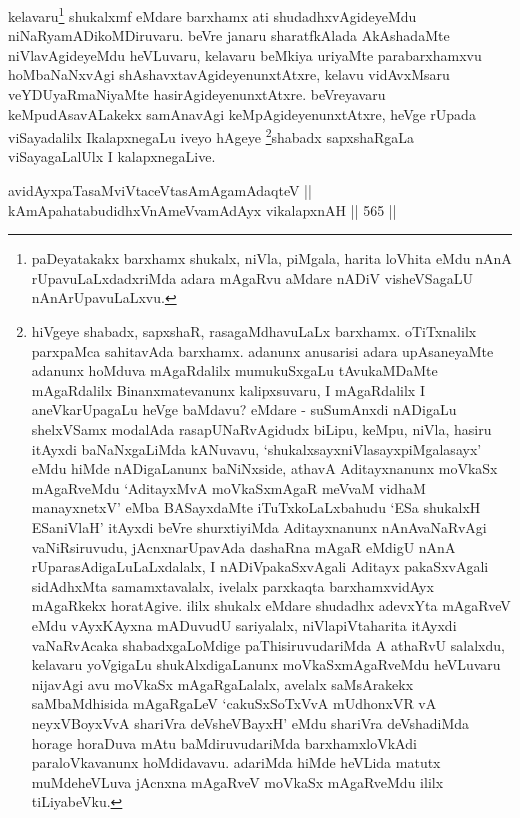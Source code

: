 \begin{artha}
kelavaru\footnote{paDeyatakakx barxhamx shukalx, niVla, piMgala,
harita loVhita eMdu nAnA rUpavuLaLxdadxriMda adara mAgaRvu aMdare
nADiV visheVSagaLU nAnArUpavuLaLxvu.} shukalxmf eMdare barxhamx ati shudadhxvAgideyeMdu niNaRyamADikoMDiruvaru. beVre janaru sharatfkAlada
AkAshadaMte niVlavAgideyeMdu heVLuvaru, kelavaru beMkiya uriyaMte
parabarxhamxvu hoMbaNaNxvAgi shAshavxtavAgideyenunxtAtxre, kelavu
vidAvxMsaru veYDUyaRmaNiyaMte hasirAgideyenunxtAtxre. beVreyavaru
keMpudAsavALakekx samAnavAgi keMpAgideyenunxtAtxre, heVge rUpada
viSayadalilx IkalapxnegaLu iveyo hAgeye \footnote{hiVgeye shabadx,
sapxshaR, rasagaMdhavuLaLx barxhamx. oTiTxnalilx parxpaMca sahitavAda
barxhamx. adanunx anusarisi adara upAsaneyaMte adanunx hoMduva
mAgaRdalilx mumukuSxgaLu tAvukaMDaMte mAgaRdalilx Binanxmatevanunx
kalipxsuvaru, I mAgaRdalilx I aneVkarUpagaLu heVge baMdavu?
eMdare - suSumAnxdi nADigaLu shelxVSamx modalAda rasapUNaRvAgidudx
biLipu, keMpu, niVla, hasiru itAyxdi baNaNxgaLiMda kANuvavu,
`shukalxsayxniVlasayxpiMgalasayx' eMdu hiMde nADigaLanunx
baNiNxside, athavA Aditayxnanunx moVkaSx mAgaRveMdu `AditayxMvA
moVkaSxmAgaR meVvaM vidhaM manayxnetxV' eMba BASayxdaMte
iTuTxkoLaLxbahudu `ESa shukalxH ESaniVlaH' itAyxdi beVre
shurxtiyiMda Aditayxnanunx nAnAvaNaRvAgi vaNiRsiruvudu,
jAcnxnarUpavAda dashaRna mAgaR eMdigU nAnA rUparasAdigaLuLaLxdalalx,
I nADiVpakaSxvAgali Aditayx pakaSxvAgali sidAdhxMta samamxtavalalx,
ivelalx parxkaqta barxhamxvidAyx mAgaRkekx horatAgive. ililx shukalx
eMdare shudadhx adevxYta mAgaRveV eMdu vAyxKAyxna mADuvudU
sariyalalx, niVlapiVtaharita itAyxdi vaNaRvAcaka shabadxgaLoMdige
paThisiruvudariMda A athaRvU salalxdu, kelavaru yoVgigaLu
shukAlxdigaLanunx moVkaSxmAgaRveMdu heVLuvaru nijavAgi avu moVkaSx
mAgaRgaLalalx, avelalx saMsArakekx saMbaMdhisida mAgaRgaLeV `cakuSxSoTxVvA mUdhonxVR vA \s neyxVBoyxVvA shariVra deVsheVBayxH' eMdu shariVra deVshadiMda horage horaDuva mAtu baMdiruvudariMda
barxhamxloVkAdi paraloVkavanunx hoMdidavavu. adariMda hiMde heVLida
matutx muMdeheVLuva jAcnxna mAgaRveV moVkaSx mAgaRveMdu ililx tiLiyabeVku.}shabadx
sapxshaRgaLa viSayagaLalUlx I kalapxnegaLive.
\end{artha}


\begin{shl}
avidAyxpaTasaMviVtaceVtasAmAgamAdaqteV || \\
kAmApahatabudidhxVnAmeVvamAdAyx vikalapxnAH \hfill || 565 ||  
\end{shl}

